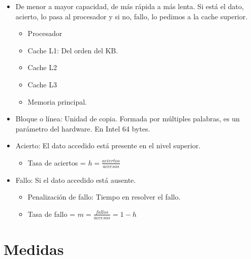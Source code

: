 \documentclass[12pt, twoside, openright]{report} %
\begin{document}
    \begin{itemize}
    
    \item
      De menor a mayor capacidad, de más rápida a más lenta. Si está el
      dato, acierto, lo pasa al procesador y si no, fallo, lo pedimos a
      la cache superior.

      \begin{itemize}
      
      \item
        Procesador
      \item
        Cache L1: Del orden del KB.
      \item
        Cache L2
      \item
        Cache L3
      \item
        Memoria principal.
      \end{itemize}
    \item
      Bloque o línea: Unidad de copia. Formada por múltiples palabras,
      es un parámetro del hardware. En Intel 64 bytes.
    \item
      Acierto: El dato accedido está presente en el nivel superior.

      \begin{itemize}
      
      \item
        Tasa de aciertos = \(h= \frac {aciertos} {accesos}\)
      \end{itemize}
    \item
      Fallo: Si el dato accedido está ausente.

      \begin{itemize}
      
      \item
        Penalización de fallo: Tiempo en resolver el fallo.
      \item
        Tasa de fallo = \(m= \frac {fallos} {accesos}=1-h\)
      \end{itemize}
    \end{itemize}
  \section{Medidas}
\end{document}
